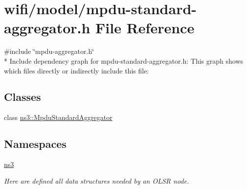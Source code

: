 \hypertarget{mpdu-standard-aggregator_8h}{}\section{wifi/model/mpdu-\/standard-\/aggregator.h File Reference}
\label{mpdu-standard-aggregator_8h}
{\ttfamily \#include \char`\"{}mpdu-\/aggregator.\+h\char`\"{}}\\*
Include dependency graph for mpdu-\/standard-\/aggregator.h\+:
This graph shows which files directly or indirectly include this file\+:
\subsection*{Classes}
\begin{DoxyCompactItemize}
\item 
class \hyperlink{classns3_1_1MpduStandardAggregator}{ns3\+::\+Mpdu\+Standard\+Aggregator}
\end{DoxyCompactItemize}
\subsection*{Namespaces}
\begin{DoxyCompactItemize}
\item 
 \hyperlink{namespacens3}{ns3}
\begin{DoxyCompactList}\small\item\em Here are defined all data structures needed by an O\+L\+SR node. \end{DoxyCompactList}\end{DoxyCompactItemize}
